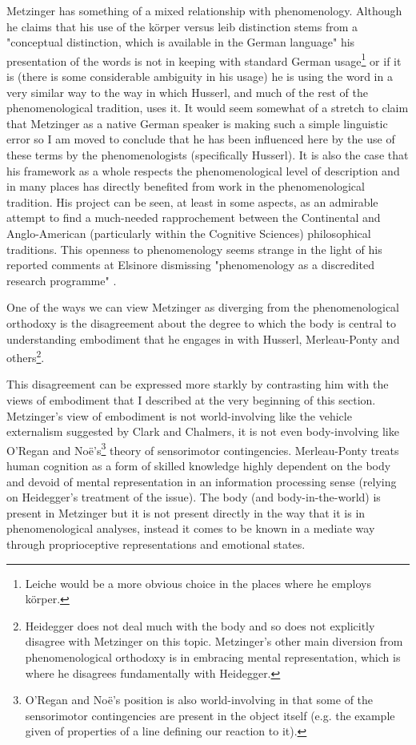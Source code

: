 Metzinger has something of a mixed relationship with phenomenology. Although he claims that his use of the k\"{o}rper versus leib distinction stems from a "conceptual distinction, which is available in the German language" his presentation of the words is not in keeping with standard German usage\footnote{Leiche would be a more obvious choice in the places where he employs k\"{o}rper.} or if it is (there is some considerable ambiguity in his usage) he is using the word in a very similar way to the way in which Husserl, and much of the rest of the phenomenological tradition, uses it. It would seem somewhat of a stretch to claim that Metzinger as a native German speaker is making such a simple linguistic error so I am moved to conclude that he has been influenced here by the use of these terms by the phenomenologists (specifically Husserl). It is also the case that his framework as a whole respects the phenomenological level of description and in many places has directly benefited from work in the phenomenological tradition. His project can be seen, at least in some aspects, as an admirable attempt to find a much-needed rapprochement between the Continental and Anglo-American (particularly within the Cognitive Sciences) philosophical traditions. This openness to phenomenology seems strange in the light of his reported comments at Elsinore dismissing "phenomenology as a discredited research programme" \cite[2,385]{gallagher2008,metzinger1995faster}.

One of the ways we can view Metzinger as diverging from the phenomenological orthodoxy is the disagreement about the degree to which the body is central to understanding embodiment that he engages in with Husserl, Merleau-Ponty and others\footnote{Heidegger does not deal much with the body and so does not explicitly disagree with Metzinger on this topic. Metzinger's other main diversion from phenomenological orthodoxy is in embracing mental representation, which is where he disagrees fundamentally with Heidegger.}.

This disagreement can be expressed more starkly by contrasting him with the views of embodiment that I described at the very beginning of this section. Metzinger's view of embodiment is not world-involving like the vehicle externalism suggested by Clark and Chalmers, it is not even body-involving like O'Regan and No\"{e}'s\footnote{O'Regan and No\"{e}'s position is also world-involving in that some of the sensorimotor contingencies are present in the object itself (e.g. the example given of properties of a line defining our reaction to it).} theory of sensorimotor contingencies. Merleau-Ponty treats human cognition as a form of skilled knowledge highly dependent on the body and devoid of mental representation in an information processing sense (relying on Heidegger's treatment of the issue). The body (and body-in-the-world) is present in Metzinger but it is not present directly in the way that it is in phenomenological analyses, instead it comes to be known in a mediate way through proprioceptive representations and emotional states.

